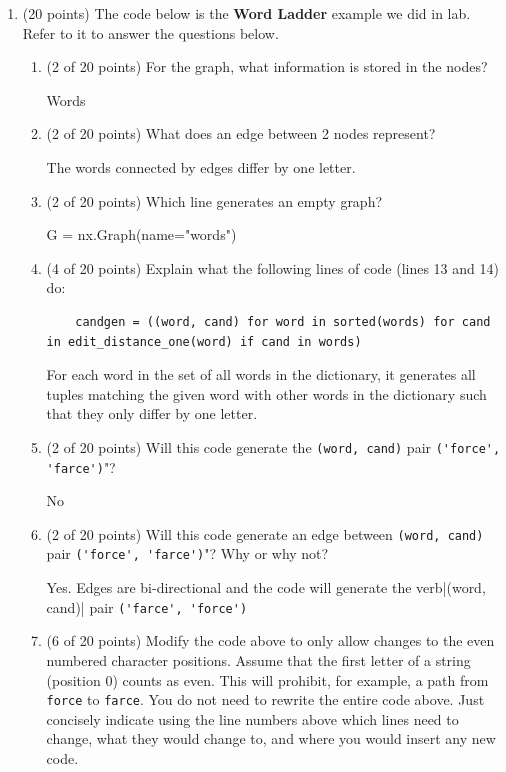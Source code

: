 \documentclass[10pt]{article}
\begin{document}
\begin{enumerate}
	\item (20 points) The code below is  the \textbf{Word Ladder} example we did 
		in lab. Refer to it to answer the questions below.


		


		\beginanswers
		\begin{enumerate}

			\newpage

			\item (2 of 20 points) For the graph, what information is stored in the nodes?
				
				\bigskip
				Words
				\bigskip

			\item (2 of 20 points) What does an edge between 2 nodes represent?

				\bigskip
				The words connected by edges differ by one letter.
				\bigskip

			\item (2 of 20 points) Which line generates an empty graph?
			
				\bigskip
				G = nx.Graph(name="words")
				\bigskip

			\item (4 of 20 points) Explain what the following lines of code (lines 13 and 14) do:
\begin{lstlisting}
	candgen = ((word, cand) for word in sorted(words) for cand in edit_distance_one(word) if cand in words)
\end{lstlisting}
\bigskip
For each word in the set of all words in the dictionary, it generates all tuples matching the given word with other words in the dictionary such that they only differ by one letter.
\bigskip

			\item (2 of 20 points) Will this code generate the \verb|(word, cand)| pair \verb|('force', 'farce')|"?

\bigskip
No
\bigskip

			\item (2 of 20 points) Will this code generate an edge between \verb|(word, cand)| pair \verb|('force', 'farce')|"? Why or why not?
			
\bigskip
Yes. Edges are bi-directional and the code will generate the verb|(word, cand)| pair \verb|('farce', 'force')|
\bigskip

		\item (6 of 20 points) Modify the code above to only allow changes to the even numbered character positions. Assume that the first letter of a string (position 0) counts as even. This will prohibit, for example, a path from \verb*|force| to \verb*|farce|. You do not need to rewrite the entire code above. Just concisely indicate using the line numbers above which lines need to change, what they would change to,  and where you would insert any new code.
			\bigskip
			

\end{enumerate}
\end{enumerate}
\end{document}
